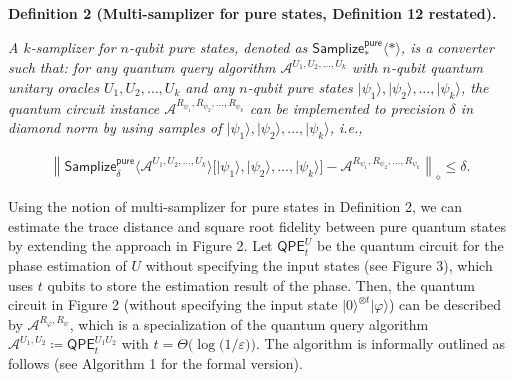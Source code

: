 \documentclass[10pt,a4paper]{article}
\begin{document}


\par\medskip\noindent\textbf{
\textbf{Definition 2}\textbf{ }(Multi-samplizer for pure states, Definition 12 restated)\textbf{.}
}\par



\emph{A $k$-samplizer for $n$-qubit pure states, denoted as $\mathsf{Samplize}^{\mathsf{pure}}_{*}\langle*\rangle$, is a converter such that:
for any quantum query algorithm $\mathcal{A}^{U_{1},U_{2},\dots,U_{k}}$ with $n$-qubit quantum unitary oracles $U_{1},U_{2},\dots,U_{k}$ and any $n$-qubit pure states $\lvert\psi_{1}\rangle,\lvert\psi_{2}\rangle,\dots,\lvert\psi_{k}\rangle$, the quantum circuit instance $\mathcal{A}^{R_{\psi_{1}},R_{\psi_{2}},\dots,R_{\psi_{k}}}$ can be implemented to precision $\delta$ in diamond norm by using samples of $\lvert\psi_{1}\rangle,\lvert\psi_{2}\rangle,\dots,\lvert\psi_{k}\rangle$, i.e.,}\par


\[\begin{gathered}
\left\lVert\mathsf{Samplize}^{\mathsf{pure}}_{\delta}\big\langle\mathcal{A}^{U_{1},U_{2},\dots,U_{k}}\big\rangle\big[\lvert\psi_{1}\rangle,\lvert\psi_{2}\rangle,\dots,\lvert\psi_{k}\rangle\big]-\mathcal{A}^{R_{\psi_{1}},R_{\psi_{2}},\dots,R_{\psi_{k}}}\right\rVert_{\diamond}\leq\delta.
\end{gathered}\]






Using the notion of multi-samplizer for pure states in Definition 2, we can estimate the trace distance and square root fidelity between pure quantum states by extending the approach in Figure 2.
Let $\mathsf{QPE}^{U}_{t}$ be the quantum circuit for the phase estimation of $U$ without specifying the input states (see Figure 3), which uses $t$ qubits to store the estimation result of the phase.
Then, the quantum circuit in Figure 2 (without specifying the input state $\lvert 0\rangle^{\otimes t}\lvert\varphi\rangle$) can be described by $\mathcal{A}^{R_{\varphi},R_{\psi}}$, which is a specialization of the quantum query algorithm $\mathcal{A}^{U_{1},U_{2}}\coloneqq\mathsf{QPE}^{U_{1}U_{2}}_{t}$ with $t=\Theta\lparen\log\lparen 1/\varepsilon\rparen\rparen$.
The algorithm is informally outlined as follows (see Algorithm 1 for the formal version).\par
\end{document}
